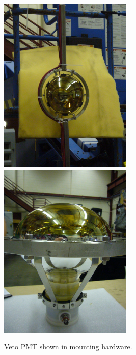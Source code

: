 \documentclass{JINST}
\begin{document}

\begin{figure}[ht]
\begin{center}
		\includegraphics[width=2.5in]{graphics/singlepmtmounted1.JPG}
		\includegraphics[width=2.5in]{graphics/singlepmtmounted2.JPG}
\caption{Veto PMT shown in mounting hardware.
\label{fig:vetopmtmountpic}}
\end{center}
\end{figure}
\end{document}
